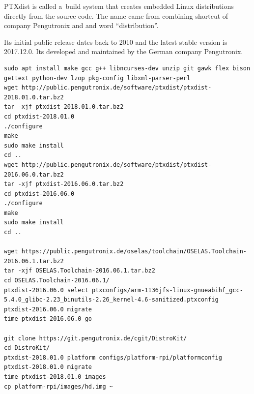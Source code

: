 \documentclass[printmode]{mgr}
\begin{document}
PTXdist is called a~build system that creates embedded Linux distributions directly from the source code. The name came from combining shortcut of company Pengutronix and and word ``distribution''.

Its initial public release dates back to 2010 and the latest stable version is 2017.12.0. Its developed and maintained by the German company Pengutronix.













\begin{lstlisting}
sudo apt install make gcc g++ libncurses-dev unzip git gawk flex bison gettext python-dev lzop pkg-config libxml-parser-perl
wget http://public.pengutronix.de/software/ptxdist/ptxdist-2018.01.0.tar.bz2
tar -xjf ptxdist-2018.01.0.tar.bz2
cd ptxdist-2018.01.0
./configure
make
sudo make install
cd ..
wget http://public.pengutronix.de/software/ptxdist/ptxdist-2016.06.0.tar.bz2
tar -xjf ptxdist-2016.06.0.tar.bz2
cd ptxdist-2016.06.0
./configure
make
sudo make install
cd ..

wget https://public.pengutronix.de/oselas/toolchain/OSELAS.Toolchain-2016.06.1.tar.bz2
tar -xjf OSELAS.Toolchain-2016.06.1.tar.bz2
cd OSELAS.Toolchain-2016.06.1/
ptxdist-2016.06.0 select ptxconfigs/arm-1136jfs-linux-gnueabihf_gcc-5.4.0_glibc-2.23_binutils-2.26_kernel-4.6-sanitized.ptxconfig
ptxdist-2016.06.0 migrate
time ptxdist-2016.06.0 go

git clone https://git.pengutronix.de/cgit/DistroKit/
cd DistroKit/
ptxdist-2018.01.0 platform configs/platform-rpi/platformconfig
ptxdist-2018.01.0 migrate
time ptxdist-2018.01.0 images
cp platform-rpi/images/hd.img ~
\end{lstlisting}
\end{document}
